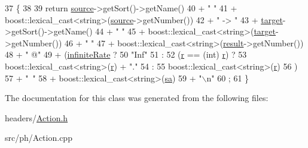 \begin{DoxyCode}
37                              \{
38 
39     \textcolor{keywordflow}{return}      \hyperlink{classAction_a3c09a49605fcc2f51ee6eb792f7bb9b4}{source}->getSort()->getName()
40                 +   \textcolor{stringliteral}{" "}
41                 +   boost::lexical\_cast<\textcolor{keywordtype}{string}>(\hyperlink{classAction_a3c09a49605fcc2f51ee6eb792f7bb9b4}{source}->getNumber())
42                 +   \textcolor{stringliteral}{" -> "}
43                 +   \hyperlink{classAction_ac77168b4d172cfc7238cfbb422fa4a98}{target}->getSort()->getName()
44                 +   \textcolor{stringliteral}{" "}
45                 +    boost::lexical\_cast<\textcolor{keywordtype}{string}>(\hyperlink{classAction_ac77168b4d172cfc7238cfbb422fa4a98}{target}->getNumber())
46                 +   \textcolor{stringliteral}{" "}
47                 +    boost::lexical\_cast<string>(\hyperlink{classAction_a5896c6900916d296ed4220063f24b78d}{result}->getNumber())
48                 +   \textcolor{stringliteral}{" @"}
49                 +   (\hyperlink{classAction_a5107742916f82d9f529f17606ad5ab74}{infiniteRate} ?
50                      \textcolor{stringliteral}{"Inf"}
51                      :
52                      (\hyperlink{classAction_a87bdc737d9edb523ec57adb27adec6b6}{r} == (\textcolor{keywordtype}{int}) \hyperlink{classAction_a87bdc737d9edb523ec57adb27adec6b6}{r}) ?
53                      boost::lexical\_cast<\textcolor{keywordtype}{string}>(\hyperlink{classAction_a87bdc737d9edb523ec57adb27adec6b6}{r}) + \textcolor{stringliteral}{"."}
54                      :
55                      boost::lexical\_cast<string>(\hyperlink{classAction_a87bdc737d9edb523ec57adb27adec6b6}{r})
56                   )
57                 +   \textcolor{stringliteral}{"~"}
58                 +    boost::lexical\_cast<string>(\hyperlink{classAction_a5832a567f356f72e4767d84ad6a6212a}{sa})
59                 +   \textcolor{stringliteral}{"\(\backslash\)n"}
60                 ;
61 \}
\end{DoxyCode}


The documentation for this class was generated from the following files\+:\begin{DoxyCompactItemize}
\item 
headers/\hyperlink{Action_8h}{Action.\+h}\item 
src/ph/Action.\+cpp\end{DoxyCompactItemize}
